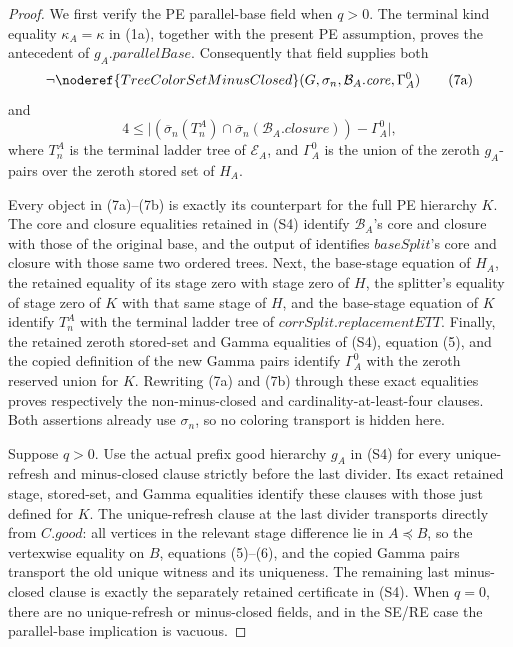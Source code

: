 \begin{proof}
We first verify the PE parallel-base field when \(q>0\).  The terminal
kind equality \(\kappa_A=\kappa\) in (1a), together with the present PE
assumption, proves the antecedent of \(g_A.\mathit{parallelBase}\).
Consequently that field supplies both
\[
 \neg\noderef{TreeColorSetMinusClosed}
   (G,\sigma_n,\mathcal B_A.\mathit{core},\Gamma_A^0)              \tag{7a}
\]
and
\[
 4\leq\bigl|(\overline\sigma_n(T_n^A)\cap
       \overline\sigma_n(\mathcal B_A.\mathit{closure}))
       -\Gamma_A^0\bigr|,                                         \tag{7b}
\]
where \(T_n^A\) is the terminal ladder tree of \(\mathcal E_A\), and
\(\Gamma_A^0\) is the union of the zeroth \(g_A\)-pairs over the zeroth
stored set of \(H_A\).

Every object in (7a)--(7b) is exactly its counterpart for the full PE
hierarchy \(K\).  The core and closure equalities retained in (S4)
identify \(\mathcal B_A\)'s core and closure with those of the original
base, and the output of  identifies
\(\mathit{baseSplit}\)'s core and closure with those same two ordered
trees.  Next, the base-stage equation of \(H_A\), the retained equality
of its stage zero with stage zero of \(H\), the splitter's equality of
stage zero of \(K\) with that same stage of \(H\), and the base-stage
equation of \(K\) identify \(T_n^A\) with the terminal ladder tree of
\(\mathit{corrSplit}.\mathit{replacementETT}\).  Finally, the retained
zeroth stored-set and Gamma equalities of (S4), equation (5), and the
copied definition of the new Gamma pairs identify \(\Gamma_A^0\) with
the zeroth reserved union for \(K\).  Rewriting (7a) and (7b) through
these exact equalities proves respectively the non-minus-closed and
cardinality-at-least-four clauses.  Both assertions already use
\(\sigma_n\), so no coloring transport is hidden here.

Suppose \(q>0\).  Use the actual prefix good hierarchy \(g_A\) in (S4)
for every unique-refresh and minus-closed clause strictly before the last
divider.  Its exact retained stage, stored-set, and Gamma equalities
identify these clauses with those just defined for \(K\).  The
unique-refresh clause at the last divider transports directly from
\(C.\mathit{good}\): all vertices in the relevant stage difference lie
in \(A\preccurlyeq B\), so the vertexwise equality on \(B\), equations
(5)--(6), and the copied Gamma pairs transport the old unique witness and
its uniqueness.  The remaining last minus-closed clause is exactly the
separately retained certificate in (S4).  When \(q=0\), there are no
unique-refresh or minus-closed fields, and in the SE/RE case the
parallel-base implication is vacuous.


\end{proof}
